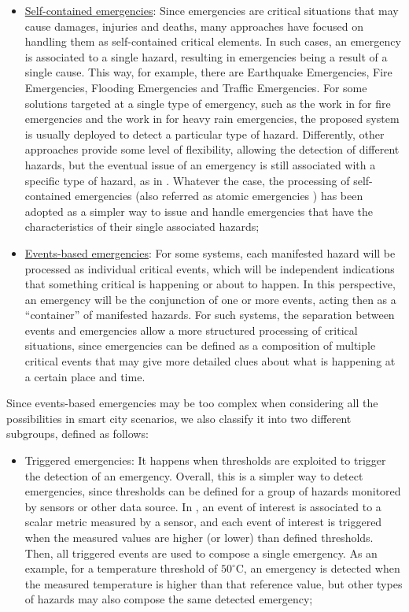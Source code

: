 \begin{refsection}
\begin{itemize}
    \item \underline{Self-contained emergencies}: Since emergencies are critical situations that may cause damages, injuries and deaths, many approaches have focused on handling them as self-contained critical elements. In such cases, an emergency is associated to a single hazard, resulting in emergencies being a result of a single cause. This way, for example, there are Earthquake Emergencies, Fire Emergencies, Flooding Emergencies and Traffic Emergencies. For some solutions targeted at a single type of emergency, such as the work in \cite{iotFire1} for fire emergencies and the work in \cite{iotRain1} for heavy rain emergencies, the proposed system is usually deployed to detect a particular type of hazard. Differently, other approaches provide some level of flexibility, allowing the detection of different hazards, but the eventual issue of an emergency is still associated with a specific type of hazard, as in \cite{emergenciesmetric4}. Whatever the case, the processing of self-contained emergencies (also referred as atomic emergencies \cite{emergenciesmetric6}) has been adopted as a simpler way to issue and handle emergencies that have the characteristics of their single associated hazards;
    
    \item \underline{Events-based emergencies}: For some systems, each manifested hazard will be processed as individual critical events, which will be independent indications that something critical is happening or about to happen. In this perspective, an emergency will be the conjunction of one or more events, acting then as a ``container'' of manifested hazards. For such systems, the separation between events and emergencies allow a more structured processing of critical situations, since emergencies can be defined as a composition of multiple critical events that may give more detailed clues about what is happening at a certain place and time.
\end{itemize}

Since events-based emergencies may be too complex when considering all the possibilities in smart city scenarios, we also classify it into two different subgroups, defined as follows:

\begin{itemize}
    \item Triggered emergencies: It happens when thresholds are exploited to trigger the detection of an emergency. Overall, this is a simpler way to detect emergencies, since thresholds can be defined for a group of hazards monitored by sensors or other data source. In \cite{emergenciesmetric2}, an event of interest is associated to a scalar metric measured by a sensor, and each event of interest is triggered when the measured values are higher (or lower) than defined thresholds. Then, all triggered events are used to compose a single emergency. As an example, for a temperature threshold of $50^{\circ}$C, an emergency is detected when the measured temperature is higher than that reference value, but other types of hazards may also compose the same detected emergency;
    

\end{itemize}
\end{refsection}
